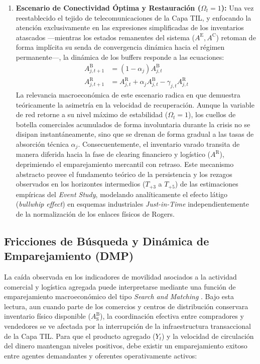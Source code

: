 \begin{enumerate}
    \item \textbf{Escenario de Conectividad \'Optima y Restauraci\'on ($\Omega_t = 1$):} Una vez reestablecido el tejido de telecomunicaciones de la Capa TIL, y enfocando la atenci\'on exclusivamente en las expresiones simplificadas de los inventarios atascados ---mientras los estados remanentes del sistema ($A^{\text{E}}, A^{\text{C}}$) retoman de forma impl\'icita su senda de convergencia din\'amica hacia el r\'egimen permanente---, la din\'amica de los buffers responde a las ecuaciones:
    \begin{align}
        A^{\text{B}}_{j, t+1} &= (1 - \alpha_j) A^{\text{B}}_{j, t} \\
        A^{\text{R}}_{j, t+1} &= A^{\text{R}}_{j, t} + \alpha_j A^{\text{B}}_{j, t} - \gamma_{j,t} A^{\text{R}}_{j, t}
    \end{align}
    La relevancia macroecon\'omica de este escenario radica en que demuestra te\'oricamente la asimetr\'ia en la velocidad de recuperaci\'on. Aunque la variable de red retorne a su nivel m\'aximo de estabilidad ($\Omega_t = 1$), los cuellos de botella comerciales acumulados de forma involuntaria durante la crisis no se disipan instant\'aneamente, sino que se drenan de forma gradual a las tasas de absorci\'on t\'ecnica $\alpha_j$. Consecuentemente, el inventario varado transita de manera diferida hacia la fase de clearing financiero y log\'istico ($A^{\text{R}}$), deprimiendo el emparejamiento mercantil con retraso. Este mecanismo abstracto provee el fundamento te\'orico de la persistencia y los rezagos observados en los horizontes intermedios ($T_{+3}$ a $T_{+5}$) de las estimaciones emp\'iricas del \textit{Event Study}, modelando anal\'iticamente el efecto l\'atigo (\textit{bullwhip effect}) en esquemas industriales \textit{Just-in-Time} independientemente de la normalizaci\'on de los enlaces f\'isicos de Rogers.
\end{enumerate}

\subsection{Fricciones de B\'usqueda y Din\'amica de Emparejamiento (DMP)}
\label{sec:B_3}

La ca\'ida observada en los indicadores de movilidad asociados a la actividad comercial y log\'istica agregada puede interpretarse mediante una funci\'on de emparejamiento macroecon\'omico del tipo \textit{Search and Matching} \citep{lagos2005unified}. Bajo esta lectura, aun cuando parte de los comercios y centros de distribuci\'on conservara inventario f\'isico disponible ($A_{\text{S}}^{\text{B}}$), la coordinaci\'on efectiva entre compradores y vendedores se ve afectada por la interrupci\'on de la infraestructura transaccional de la Capa TIL. Para que el producto agregado ($Y_t$) y la velocidad de circulaci\'on del dinero mantengan niveles positivos, debe existir un emparejamiento exitoso entre agentes demandantes y oferentes operativamente activos:

